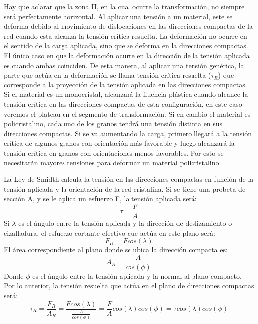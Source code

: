 \documentclass[a4paper,12pt,fleqn,twoside,openany]{book}
\begin{document}
Hay que aclarar que la zona II, en la cual ocurre la transformación, no siempre será perfectamente horizontal. Al aplicar una tensión a un material, 
este se deforma debido al movimiento de dislocaciones en las direcciones compactas de la red cuando esta alcanza la tensión crítica resuelta. La deformación no ocurre 
en el sentido de la carga aplicada, sino que se deforma en la direcciones compactas. El único caso en que la deformación ocurre en la dirección de la tensión aplicada 
es cuando ambas coinciden. De esta manera, al aplicar una tensión genérica, la parte que actúa en la deformación se llama tensión crítica resuelta ($\tau_{R}$) que corresponde a la 
proyección de la tensión aplicada en las direcciones compactas. Si el material es un monocristal, alcanzará la fluencia plástica cuando alcance la tensión crítica en 
las direcciones compactas de esta configuración, en este caso veremos el plateau en el segmento de transformación. Si en cambio el material es policristalino, cada uno 
de los granos tendrá una tensión distinta en sus direcciones compactas. Si se va aumentando la carga, primero llegará a la tensión crítica de algunos granos con orientación 
más favorable y luego alcanzará la tensión crítica en granos con orientaciones menos favorables. Por esto se necesitarán mayores tensiones para deformar un material policristalino.

La Ley de Smidth calcula la tensión en las direcciones compactas en función de la tensión aplicada y la orientación de la red cristalina. Si se tiene una probeta de 
sección A, y se le aplica un esfuerzo F, la tensión aplicada será:
\begin{equation}
 \tau = \frac{F}{A}
\end{equation}
Si $\lambda$ es el ángulo entre la tensión aplicada y la dirección de deslizamiento o cizalladura, el esfuerzo cortante efectivo que actúa en este plano será:
\begin{equation}
 F_{R}= F cos(\lambda)
\end{equation}
El área correspondiente al plano donde se ubica la dirección compacta es:
\begin{equation}
 A_{R}=\frac{A}{cos(\phi)}
\end{equation}
Donde $\phi$ es el ángulo entre la tensión aplicada y la normal al plano compacto. Por lo anterior, la tensión resuelta que actúa en el plano de direcciones compactas será:
\begin{equation}
 \tau_{R}=\frac{F_{R}}{A_{R}}= \frac{Fcos(\lambda) }{\frac{A}{cos(\phi)}}=\frac{F}{A} cos(\lambda)cos(\phi) = \tau cos(\lambda)cos(\phi)
\end{equation}
\end{document}
